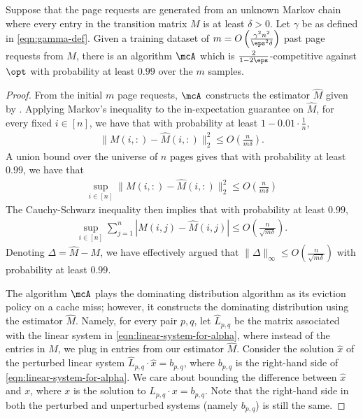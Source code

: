 \begin{theorem}
    \label{thm:approx-lpr-from-samples}
    Suppose that the page requests are generated from an unknown Markov chain where every entry in the transition matrix $M$ is at least $\delta > 0$. Let $\gamma$ be as defined in \eqref{eqn:gamma-def}. Given a training dataset of $m = O\left(\frac{\gamma^2n^2}{\eps^2\delta}\right)$ past page requests from $M$, there is an algorithm $\mcA$ which is $\frac{2}{1-2\eps}$-competitive against $\opt$ with probability at least $0.99$ over the $m$ samples.
\end{theorem}
\begin{proof}
    From the initial $m$ page requests, $\mcA$ constructs the estimator $\hat{M}$ given by . Applying Markov's inequality to the in-expectation guarantee on $\hat{M}$, for every fixed $i \in [n]$, we have that with probability at least $1-0.01 \cdot \frac{1}{n}$, 
    \begin{align*}
        \|M(i,:) - \hat{M}(i,:)\|_2^2 \le O \left(\frac{n}{m\delta}\right).
    \end{align*}
    A union bound over the universe of $n$ pages gives that with probability at least $0.99$, we have that 
    \begin{align*}
        \sup_{i \in [n]}\|M(i,:) - \hat{M}(i,:)\|_2^2 \le O \left(\frac{n}{m\delta}\right)
    \end{align*}
    The Cauchy-Schwarz inequality then implies that with probability at least $0.99$,
    \begin{align*}
        \sup_{i \in [n]}\sum_{j=1}^n |M(i,j)-\hat{M}(i,j)| \le O \left(\frac{n}{\sqrt{m\delta}}\right).
    \end{align*}
    Denoting $\Delta = \hat{M}-M$, we have effectively argued that $\|\Delta\|_\infty \le O \left(\frac{n}{\sqrt{m\delta}}\right)$ with probability at least $0.99$.

    The algorithm $\mcA$ plays the dominating distribution algorithm as its eviction policy on a cache miss; however, it constructs the dominating distribution using the estimator $\hat{M}$. Namely, for every pair $p,q$, let $\hat{L}_{p,q}$ be the matrix associated with the linear system in \eqref{eqn:linear-system-for-alpha}, where instead of the entries in $M$, we plug in entries from our estimator $\hat{M}$. Consider the solution $\hat{x}$ of the perturbed linear system $\hat{L}_{p,q} \cdot \hat{x} = b_{p,q}$, where $b_{p,q}$ is the right-hand side of \eqref{eqn:linear-system-for-alpha}. We care about bounding the difference between $\hat{x}$ and $x$, where $x$ is the solution to $L_{p,q} \cdot x = b_{p,q}$. Note that the right-hand side in both the perturbed and unperturbed systems (namely $b_{p,q}$) is still the same.
    

\end{proof}
